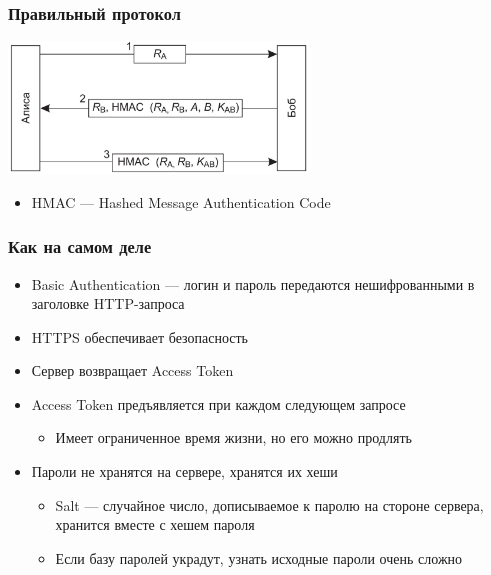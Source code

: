 \documentclass{../../slides-style}
\begin{document}
    \begin{frame}
        \frametitle{Правильный протокол}
        \begin{center}
            \includegraphics[width=0.6\textwidth]{hmacs.png}
        \end{center}
        \begin{itemize}
            \item HMAC --- Hashed Message Authentication Code
        \end{itemize}
    \end{frame}

    \begin{frame}
        \frametitle{Как на самом деле}
        \begin{itemize}
            \item Basic Authentication --- логин и пароль передаются нешифрованными в заголовке HTTP-запроса
            \item HTTPS обеспечивает безопасность
            \item Сервер возвращает Access Token
            \item Access Token предъявляется при каждом следующем запросе
            \begin{itemize}
                \item Имеет ограниченное время жизни, но его можно продлять
            \end{itemize}
            \item Пароли не хранятся на сервере, хранятся их хеши
            \begin{itemize}
                \item Salt --- случайное число, дописываемое к паролю на стороне сервера, хранится вместе с хешем пароля
                \item Если базу паролей украдут, узнать исходные пароли очень сложно
            \end{itemize}
        \end{itemize}
    \end{frame}
\end{document}

